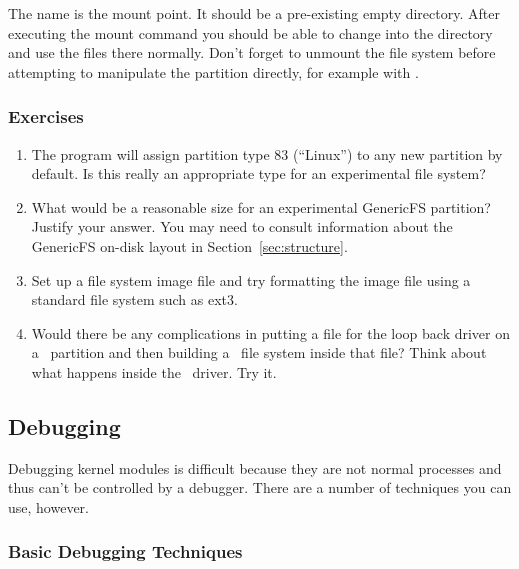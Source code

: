 The name  is the mount point. It should be a pre-existing empty directory. After
executing the mount command you should be able to change into the  directory and
use the files there normally. Don't forget to unmount the file system before attempting to
manipulate the partition directly, for example with .

\subsubsection*{Exercises}

\begin{enumerate}

\item The  program will assign partition type 83 (``Linux'') to any new partition
  by default. Is this really an appropriate type for an experimental file system?

\item What would be a reasonable size for an experimental GenericFS partition? Justify your
  answer. You may need to consult information about the GenericFS on-disk layout in
  Section~\ref{sec:structure}.

\item Set up a file system image file and try formatting the image file using a standard file
  system such as ext3.

\item Would there be any complications in putting a file for the loop back driver on a
  \GenericFS\ partition and then building a \GenericFS\ file system inside that file? Think
  about what happens inside the \GenericFS\ driver. Try it.

\end{enumerate}

\subsection{Debugging \GenericFS}
\label{sec:debugging}

Debugging kernel modules is difficult because they are not normal processes and thus can't be
controlled by a debugger. There are a number of techniques you can use, however.

\subsubsection{Basic Debugging Techniques}

